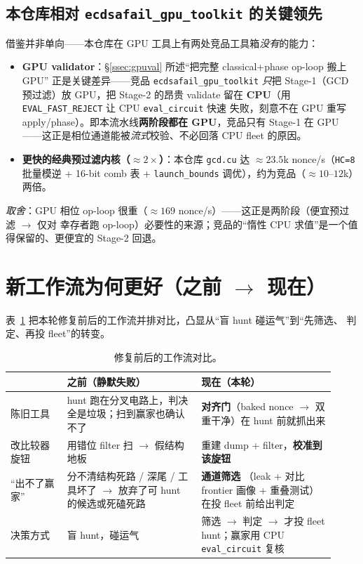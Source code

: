 \documentclass[11pt]{ctexart}
\let\c\lstinline
\begin{document}
\subsection{本仓库相对 \texttt{ecdsafail\_gpu\_toolkit} 的关键领先}
借鉴并非单向——本仓库在 GPU 工具上有两处竞品工具箱\emph{没有}的能力：
\begin{itemize}[nosep]
  \item \textbf{GPU validator}：§\ref{ssec:gpuval} 所述``把完整 classical+phase op-loop 搬上 GPU''
  正是关键差异——竞品 \texttt{ecdsafail\_gpu\_toolkit} \emph{只}把 Stage-1（GCD 预过滤）放 GPU，把
  Stage-2 的昂贵 validate 留在 \textbf{CPU}（用 \c{EVAL_FAST_REJECT} 让 CPU \c{eval_circuit} 快速
  失败，刻意不在 GPU 重写 apply/phase）。即本流水线\textbf{两阶段都在 GPU}，竞品只有 Stage-1 在 GPU
  ——这正是相位通道能被\emph{流式}校验、不必回落 CPU fleet 的原因。
  \item \textbf{更快的经典预过滤内核（$\approx 2\times$）}：本仓库 \c{gcd.cu} 达 $\approx 23.5$k
  nonce/s（\c{HC=8} 批量模逆 + 16-bit comb 表 + \c{launch_bounds} 调优），约为竞品（$\approx
  10$--$12$k）两倍。
\end{itemize}
\emph{取舍}：GPU 相位 op-loop 很重（$\approx 169$ nonce/s）——这正是两阶段（便宜预过滤 $\to$ 仅对
幸存者跑 op-loop）必要性的来源；竞品的``惰性 CPU 求值''是一个值得保留的、更便宜的 Stage-2 回退。

\section{新工作流为何更好（之前 $\to$ 现在）}
表~\ref{tab:beforeafter} 把本轮修复前后的工作流并排对比，凸显从``盲 hunt 碰运气''到``先筛选、
判定、再投 fleet''的转变。
\begin{table}[h]\centering\small
\begin{tabular}{@{}p{0.16\linewidth}p{0.38\linewidth}p{0.38\linewidth}@{}}
\toprule
 & 之前（静默失败） & 现在（本轮） \\ \midrule
陈旧工具 & hunt 跑在分叉电路上，判决全是垃圾；扫到赢家也确认不了 & \textbf{对齐门}（baked nonce $\to$
双重干净）在 hunt 前就抓出来 \\
改比较器旋钮 & 用错位 filter 扫 $\to$ 假结构地板 & 重建 dump + filter，\textbf{校准到该旋钮} \\
``出不了赢家'' & 分不清结构死路 / 深尾 / 工具坏了 $\to$ 放弃了可 hunt 的候选或死磕死路 & \textbf{通道筛选}
（leak + 对比 frontier 画像 + 重叠测试）在投 fleet 前给出判定 \\
决策方式 & 盲 hunt，碰运气 & 筛选 $\to$ 判定 $\to$ 才投 fleet hunt；赢家用 CPU \c{eval_circuit} 复核 \\
\bottomrule
\end{tabular}
\caption{修复前后的工作流对比。}
\label{tab:beforeafter}
\end{table}
\end{document}
